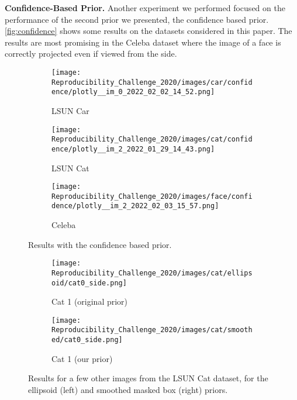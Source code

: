 \textbf{Confidence-Based Prior.}
Another experiment we performed focused on the performance of the second prior we presented, the confidence based prior. \autoref{fig:confidence} shows some results on the datasets considered in this paper. The results are most promising in the Celeba dataset where the image of a face is correctly projected even if viewed from the side.
\begin{figure}[!htb]
    \centering
    \begin{subfigure}{0.32\textwidth}
        \centering
        \texttt{[image: Reproducibility\_Challenge\_2020/images/car/confidence/plotly\_\_im\_0\_2022\_02\_02\_14\_52.png]}
        \caption{LSUN Car}
        \label{}
    \end{subfigure}
    \begin{subfigure}{0.32\textwidth}
        \centering
        \texttt{[image: Reproducibility\_Challenge\_2020/images/cat/confidence/plotly\_\_im\_2\_2022\_01\_29\_14\_43.png]}
        \caption{LSUN Cat}
        \label{}
    \end{subfigure}
    \begin{subfigure}{0.32\textwidth}
        \centering
        \texttt{[image: Reproducibility\_Challenge\_2020/images/face/confidence/plotly\_\_im\_2\_2022\_02\_03\_15\_57.png]}
        \caption{Celeba}
        \label{}
    \end{subfigure}
    \caption{Results with the confidence based prior.}
    \label{fig:confidence}
\end{figure}

\begin{figure}[!htb]
    \centering
    \begin{subfigure}{0.4\textwidth}
        \centering
        \texttt{[image: Reproducibility\_Challenge\_2020/images/cat/ellipsoid/cat0\_side.png]}
        \caption{Cat 1 (original prior)}
    \end{subfigure}
    \begin{subfigure}{0.4\textwidth}
        \centering
        \texttt{[image: Reproducibility\_Challenge\_2020/images/cat/smoothed/cat0\_side.png]}
        \caption{Cat 1 (our prior)}
    \end{subfigure}
    \caption{Results for a few other images from the LSUN Cat dataset, for the ellipsoid (left) and smoothed masked box (right) priors.}
    \label{fig:appendix-ellips_vs_box}
\end{figure}

\newpage

